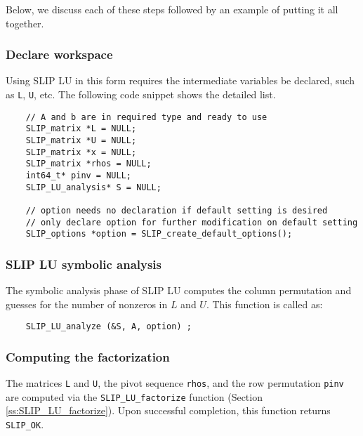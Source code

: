 \documentclass[12pt]{article}
\theoremstyle{definition}
\begin{document}
Below, we discuss each of these steps followed by an example of putting it all
together.

\subsubsection{Declare workspace}

Using SLIP LU in this form requires the intermediate variables be declared,
such as \verb|L|, \verb|U|, etc. The following code snippet shows the
detailed list.

{\small
\begin{verbatim}
    // A and b are in required type and ready to use
    SLIP_matrix *L = NULL;
    SLIP_matrix *U = NULL;
    SLIP_matrix *x = NULL;
    SLIP_matrix *rhos = NULL;
    int64_t* pinv = NULL;
    SLIP_LU_analysis* S = NULL;

    // option needs no declaration if default setting is desired
    // only declare option for further modification on default setting
    SLIP_options *option = SLIP_create_default_options();
     \end{verbatim} }

\subsubsection{SLIP LU symbolic analysis}

The symbolic analysis phase of SLIP LU computes the column permutation and
guesses for the number of nonzeros in $L$ and $U$. This function is called as:

{\small
    \begin{verbatim}
    SLIP_LU_analyze (&S, A, option) ; \end{verbatim} }


\subsubsection{Computing the factorization}

The matrices \verb|L| and \verb|U|, the pivot sequence \verb|rhos|, and the row
permutation \verb|pinv| are computed via the \verb|SLIP_LU_factorize| function
(Section \ref{ss:SLIP_LU_factorize}).  Upon successful completion, this
function returns \verb|SLIP_OK|.
\end{document}
